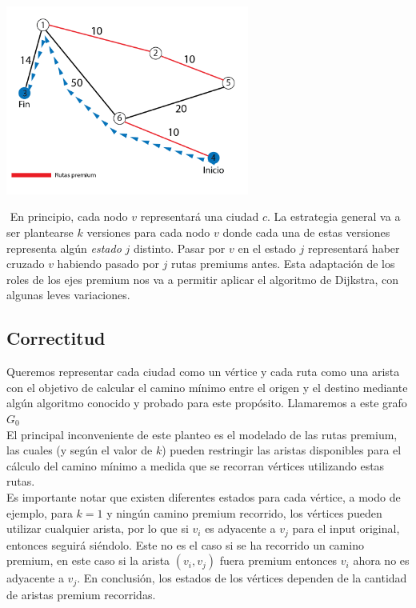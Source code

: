 {\centering
	\includegraphics[width=0.6\textwidth]{imagenes/problema1/problema1-c2-solved.png} \\
}

$ $ \newline
En principio, cada nodo $v$ representará una ciudad $c$. La estrategia general va a ser plantearse $k$ versiones para cada nodo $v$ donde cada una de estas versiones representa algún \textit{estado} $j$ distinto. Pasar por $v$ en el estado $j$ representará haber cruzado $v$ habiendo pasado por $j$ rutas premiums antes. Esta adaptación de los roles de los ejes premium nos va a permitir aplicar el algoritmo de Dijkstra, con algunas leves variaciones.

\subsection{Correctitud}
Queremos representar cada ciudad como un vértice y cada ruta como una arista con el objetivo de calcular el camino mínimo entre el origen y el destino mediante algún algoritmo conocido y probado para este propósito. Llamaremos a este grafo $G_0$\\

El principal inconveniente de este planteo es el modelado de las rutas premium, las cuales (y según el valor de $k$) pueden restringir las aristas disponibles para el cálculo del camino mínimo a medida que se recorran vértices utilizando estas rutas.\\

Es importante notar que existen diferentes estados para cada vértice, a modo de ejemplo, para $k=1$ y ningún camino premium recorrido, los vértices pueden utilizar cualquier arista, por lo que si $v_i$ es adyacente a $v_j$ para el input original, entonces seguirá siéndolo. Este no es el caso si se ha recorrido un camino premium, en este caso si la arista $(v_i, v_j)$ fuera premium entonces $v_i$ ahora no es adyacente a $v_j$. En conclusión, los estados de los vértices dependen de la cantidad de aristas premium recorridas.\\


